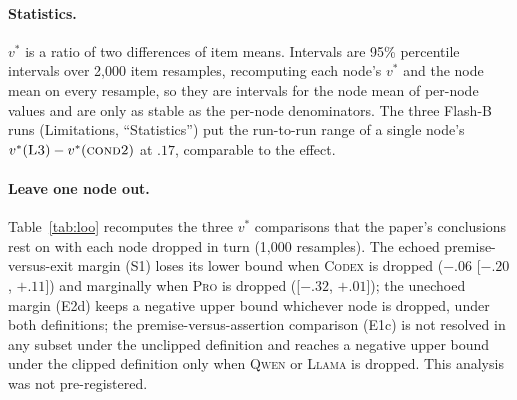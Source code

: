 \documentclass[11pt]{article}
\begin{document}
\paragraph{Statistics.} $v^\ast$ is a ratio of two differences of item means. Intervals are 95\% percentile intervals over 2{,}000 item resamples, recomputing each node's $v^\ast$ and the node mean on every resample, so they are intervals for the node mean of per-node values and are only as stable as the per-node denominators. The three Flash-B runs (Limitations, ``Statistics'') put the run-to-run range of a single node's $v^\ast(\textsc{L3})-v^\ast(\textsc{cond2})$ at $.17$, comparable to the effect.

\paragraph{Leave one node out.} Table~\ref{tab:loo} recomputes the three $v^\ast$ comparisons that the paper's conclusions rest on with each node dropped in turn (1{,}000 resamples). The echoed premise-versus-exit margin (S1) loses its lower bound when \textsc{Codex} is dropped ($-.06$ [$-.20$, $+.11$]) and marginally when \textsc{Pro} is dropped ([$-.32$, $+.01$]); the unechoed margin (E2d) keeps a negative upper bound whichever node is dropped, under both definitions; the premise-versus-assertion comparison (E1c) is not resolved in any subset under the unclipped definition and reaches a negative upper bound under the clipped definition only when \textsc{Qwen} or \textsc{Llama} is dropped. This analysis was not pre-registered.
\end{document}
